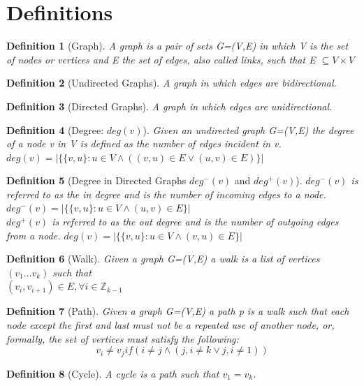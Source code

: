 \documentclass[12pt,letterpaper]{article}
\newtheorem{definition}{Definition}[section]
\begin{document}
\section{Definitions}
\begin{definition}[Graph]\hfill \break
A graph is a pair of sets G=(V,E) in which V is the set of nodes or vertices and E the set of edges, also called links, such that E $\subseteq V\times V$  
\end{definition}
\begin{definition}[Undirected Graphs]\hfill \break
A graph in which edges are bidirectional.
\end{definition}
\begin{definition}[Directed Graphs]\hfill \break
A graph in which edges are unidirectional.
\end{definition}
\begin{definition}[Degree: $deg(v)$]\hfill \break
Given an undirected graph G=(V,E) the degree of a node v in V is defined as the number of edges incident in v. \\ $deg(v)=|\{\{v,u\}:u\in V \wedge ((v,u)\in E \vee (u,v)\in E)\}|$
\end{definition}
\begin{definition}[Degree in Directed Graphs $deg^-(v)$ and $deg^+(v)$]\hfill \break
$deg^-(v)$ is referred to as the in degree and is the number of incoming edges to a node. $deg^-(v)=|\{\{v,u\}:u\in V \wedge (u,v)\in E\}|$ \\
$deg^+(v)$ is referred to as the out degree and is the number of outgoing edges from a node. $deg(v)=|\{\{v,u\}:u\in V \wedge (v,u)\in E \}|$
\end{definition}
\begin{definition}[Walk]\hfill \break
Given a graph G=(V,E) a walk is a list of vertices $(v_1\dots v_k)$ such that \\ $(v_i,v_{i+1})\in E, \forall i \in \mathbb{Z}_{k-1} $
\end{definition}
\begin{definition}[Path]\hfill \break
Given a graph G=(V,E) a path p is a walk such that each node except the first and last must not be a repeated use of another node, or, formally, the set of vertices must satisfy the following:
\[v_i\neq v_j if(i\neq j \wedge (j,i\neq k \vee j,i\neq 1))\]
\end{definition}
\begin{definition}[Cycle]\hfill \break
A cycle is a path such that $v_1=v_k$.
\end{definition}
\end{document}
